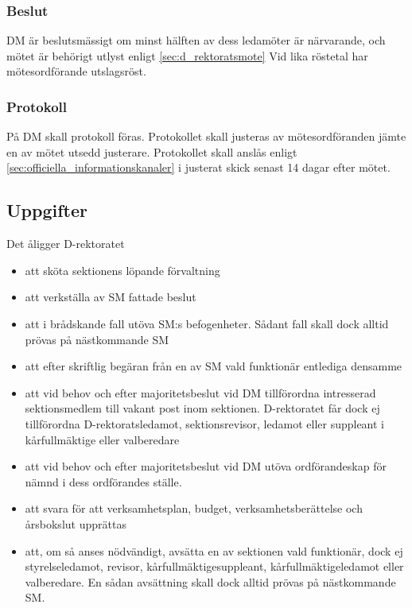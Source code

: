 \documentclass[a4paper,12pt]{article}
\begin{document}
\subsubsection{Beslut}

DM är beslutsmässigt om minst hälften av dess ledamöter är närvarande, och mötet är behörigt utlyst enligt \ref{sec:d_rektoratsmote} Vid lika röstetal har mötesordförande utslagsröst.

\subsubsection{Protokoll}

På DM skall protokoll föras. Protokollet skall justeras av mötesordföranden jämte en av mötet utsedd justerare. Protokollet skall anslås enligt \ref{sec:officiella_informationskanaler} i justerat skick senast 14 dagar efter mötet.

\subsection{Uppgifter}

Det åligger D-rektoratet

\begin{itemize}
  \item att sköta sektionens löpande förvaltning
  \item att verkställa av SM fattade beslut
  \item att i brådskande fall utöva SM:s befogenheter. Sådant fall skall dock alltid prövas på nästkommande SM
  \item att efter skriftlig begäran från en av SM vald funktionär entlediga densamme
  \item att vid behov och efter majoritetsbeslut vid DM tillförordna intresserad sektionsmedlem till vakant post inom sektionen. D-rektoratet får dock ej tillförordna D-rektoratsledamot, sektionsrevisor, ledamot eller suppleant i kårfullmäktige eller valberedare
  \item att vid behov och efter majoritetsbeslut vid DM utöva ordförandeskap för nämnd i dess ordförandes ställe.
  \item att svara för att verksamhetsplan, budget, verksamhetsberättelse och årsbokslut upprättas
  \item att, om så anses nödvändigt, avsätta en av sektionen vald funktionär, dock ej styrelseledamot, revisor, kårfullmäktigesuppleant, kårfullmäktigeledamot eller valberedare. En sådan avsättning skall dock alltid prövas på nästkommande SM.
\end{itemize}
\end{document}
